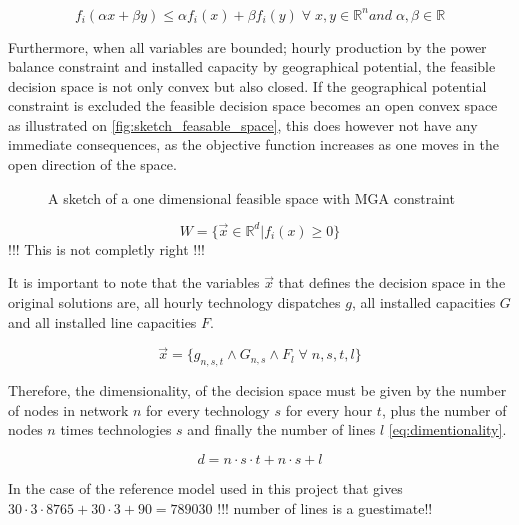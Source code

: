 \begin{equation}\label{eq:convex_requirement}
f_i(\alpha x + \beta y) \leq \alpha f_i(x) + \beta f_i(y) \; \forall \; x, y \in \mathbb{R}^n and  \; \alpha, \beta \in \mathbb{R}
\end{equation}

Furthermore, when all variables are bounded; hourly production by the power balance constraint and installed capacity by geographical potential, the feasible decision space is not only convex but also closed. If the geographical potential constraint is excluded the feasible decision space becomes an open convex space as illustrated on \vref{fig:sketch_feasable_space}, this does however not have any immediate consequences, as the objective function increases as one moves in the open direction of the space. 

\begin{figure}[ht]
	\centering
	\caption{A sketch of a one dimensional feasible space with MGA constraint }
	\label{fig:sketch_feasable_space}
\end{figure}

\begin{equation}
W = \{ \vec{x}\in \mathbb{R}^d | f_i(x) \geq 0 \}
\end{equation}
!!! This is not completly right !!! 


It is important to note that the variables $\vec{x}$ that defines the decision space in the original solutions are, all hourly technology dispatches $g$, all installed capacities $G$ and all installed line capacities $F$. 

\begin{equation}
\vec{x} = \{g_{n,s,t} \wedge G_{n,s} \wedge F_l \; \forall \; n,s,t,l \}
\end{equation}

Therefore, the dimensionality, of the decision space must be given by the number of nodes in network $n$ for every technology $s$ for every hour $t$, plus the number of nodes $n$ times technologies $s$ and finally the number of lines $l$  \vref{eq:dimentionality}.

\begin{equation}\label{eq:dimentionality}
d = n\cdot s \cdot t + n\cdot s + l
\end{equation}


In the case of the reference model used in this project that gives 
$ 30 \cdot 3 \cdot 8765 + 30 \cdot 3 + 90 = 789030$ 
!!! number of lines is a guestimate!!

